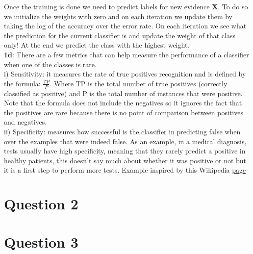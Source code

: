 \documentclass[11pt]{article}
\begin{document}
Once the training is done we need to predict labels for new evidence \textbf{X}. To do so we initialize the weights with zero and on each iteration we update them by taking the log of the accuracy over the error rate. On each iteration we see what the prediction for the current classifier is and update the weight of that class only! At the end we predict the class with the highest weight.\\

\textbf{1d}: There are a few metrics that can help measure the performance of a classifier when one of the classes is rare.\\

i) Sensitivity: it measures the rate of true positives recognition and is defined by the formula: $\frac{TP}{P}$. Where TP is the total number of true positives (correctly classified as positive) and P is the total number of instances that were positive. Note that the formula does not include the negatives so it ignores the fact that the positives are rare because there is no point of comparison between positives and negatives.\\

ii) Specificity: measures how successful is the classifier in predicting false when over the examples that were indeed false. As an example, in a medical diagnosis, tests usually have high specificity, meaning that they rarely predict a positive in healthy patients, this doesn't say much about whether it was positive or not but it is a first step to perform more tests. Example inspired by this Wikipedia \href{https://en.wikipedia.org/wiki/Sensitivity_and_specificity#Sensitivity}{page}

\section*{Question 2}

\section*{Question 3}
\end{document}
